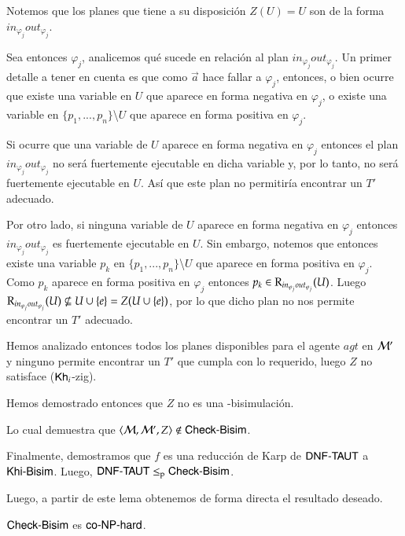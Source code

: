 \begin{demostracion}
\begin{itemize}
    Notemos que los planes que tiene a su disposición $Z(U) = U$ son de la forma $in_{\varphi_j}out_{\varphi_j}$.

    Sea entonces $\varphi_j$, analicemos qué sucede en relación al plan $in_{\varphi_j}out_{\varphi_j}$. 
    Un primer detalle a tener en cuenta es que como $\overrightarrow{a}$ hace fallar a $\varphi_j$, entonces, 
    o bien ocurre que existe una variable en $U$ que aparece en forma negativa en $\varphi_j$, 
    o existe una variable en $\{p_1,...,p_n\}$\textbackslash$U$ que aparece en forma positiva en $\varphi_j$.

    Si ocurre que una variable de $U$ aparece en forma negativa en $\varphi_j$ entonces el plan 
    $in_{\varphi_j}out_{\varphi_j}$ no será fuertemente ejecutable en dicha variable y, por lo tanto, 
    no será fuertemente ejecutable en $U$. Así que este plan no permitiría encontrar un $T'$ adecuado.

    Por otro lado, si ninguna variable de $U$ aparece en forma negativa en $\varphi_j$ entonces 
    $in_{\varphi_j}out_{\varphi_j}$ es fuertemente ejecutable en $U$. Sin embargo, notemos que 
    entonces existe una variable $p_k$ en $\{p_1,...,p_n\}$\textbackslash$U$ que aparece en forma positiva en $\varphi_j$. 
    Como $p_k$ aparece en forma positiva en $\varphi_j$ entonces $p_k \in \mathrm{R}_{in_{\varphi_j}out_{\varphi_j}}(U)$. 
    Luego $\mathrm{R}_{in_{\varphi_j}out_{\varphi_j}}(U) \not \subseteq U \cup \{e\} = Z(U \cup \{e\})$, por lo que dicho plan no nos 
    permite encontrar un $T'$ adecuado.
    
    Hemos analizado entonces todos los planes disponibles para el agente $agt$ en $\mathcal{M}'$ y ninguno permite encontrar un 
    $T'$ que cumpla con lo requerido, luego $Z$ no satisface ($\mathsf{Kh}_i$-zig).

    Hemos demostrado entonces que $Z$ no es una \KHilogic-bisimulación.

    Lo cual demuestra que $\langle \mathcal{M},\mathcal{M}',Z \rangle \not \in \rm\textsf{Check-Bisim}$.
    \end{itemize}
    Finalmente, demostramos que $f$ es una reducción de Karp de $\rm\textsf{DNF-TAUT}$ a $\rm\textsf{Khi-Bisim}$. Luego, $\rm\textsf{DNF-TAUT} \leq_p \rm\textsf{Check-Bisim}$.
\end{demostracion}

Luego, a partir de este lema obtenemos de forma directa el resultado deseado.

\begin{corolario}\label{col:cbisim-conphard}
    $\rm\textsf{Check-Bisim}$ es $\rm\textsf{co-NP-hard}$.
\end{corolario}

